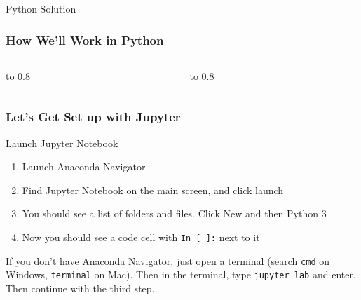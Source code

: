 \documentclass[handout, 11pt]{beamer}
\begin{document}
\begin{section}{Python Solution}
\begin{frame}
\frametitle{How We'll Work in Python}
\begin{columns}
\begin{column}{0.5\textwidth}
\vbox to 0.8
\end{column}
\begin{column}{0.5\textwidth}
\vbox to 0.8
\end{column}
\end{columns}
\end{frame}
\begin{frame}
\frametitle{Let's Get Set up with Jupyter}
{
\begin{block}{Launch Jupyter Notebook}
\begin{enumerate}
\item Launch Anaconda Navigator
\item Find Jupyter Notebook on the main screen, and click launch
\item You should see a list of folders and files. Click New and then Python 3
\item Now you should see a code cell with \texttt{In [ ]:} next to it
\end{enumerate}
\vfill
\end{block}
}
\begin{alertblock}{}
If you don't have Anaconda Navigator, just open a terminal (search \texttt{cmd} on Windows, \texttt{terminal} on Mac). Then in the terminal, type \texttt{jupyter lab} and enter. Then continue with the third step.
\end{alertblock}
\end{frame}

\end{section}
\end{document}

